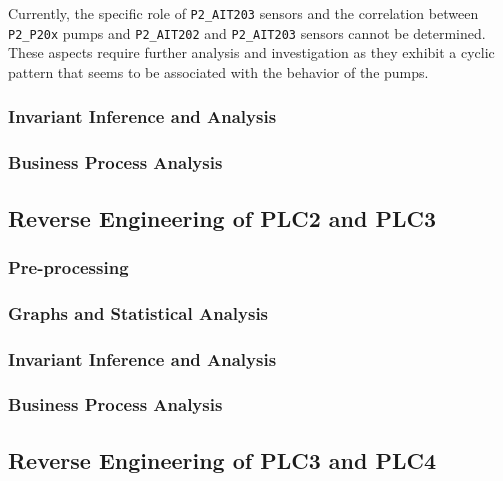 \bigskip
Currently, the specific role of \texttt{P2\_AIT203} sensors and the correlation between \texttt{P2\_P20x} pumps and \texttt{P2\_AIT202} and \texttt{P2\_AIT203} sensors cannot be determined. These aspects require further analysis and investigation as they exhibit a cyclic pattern that seems to be associated with the behavior of the pumps.

\vfill

\subsubsection{Invariant Inference and Analysis}
\label{subsubsec:6_P1P2_invariants}

\subsubsection{Business Process Analysis}
\label{subsubsec:6_P1P2_bpa}

\subsection{Reverse Engineering of PLC2 and PLC3}
\label{subsec:6_P2P3_analysis}

\subsubsection{Pre-processing}
\label{subsubsec:6_P2P3_preprocessing}

\subsubsection{Graphs and Statistical Analysis}
\label{subsubsec:6_P2P3_graphs}

\subsubsection{Invariant Inference and Analysis}
\label{subsubsec:6_P2P3_invariants}

\subsubsection{Business Process Analysis}
\label{subsubsec:6_P2P3_bpa}

\subsection{Reverse Engineering of PLC3 and PLC4}
\label{subsec:6_P3P4_analysis}

